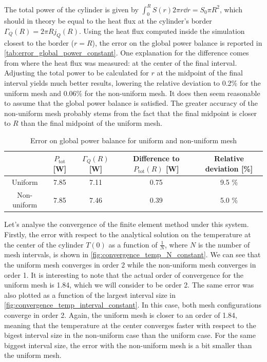 The total power of the cylinder is given by \(\int_{0}^{R} S(r) 2\pi r \dd r = S_0 \pi R^2\), which should in theory be equal to the heat flux at the cylinder's border \(\Gamma_Q(R) = 2 \pi R j_Q(R)\). Using the heat flux computed inside the simulation closest to the border (\(r=R\)), the error on the global power balance is reported in \autoref{tab:error_global_power_constant}. One explanation for the difference comes from where the heat flux was measured: at the center of the final interval. Adjusting the total power to be calculated for \(r\) at the midpoint of the final interval yields much better results, lowering the relative deviation to 0.2\% for the uniform mesh and 0.06\% for the non-uniform mesh. It does then seem reasonable to assume that the global power balance is satisfied. The greater accuracy of the non-uniform mesh probably stems from the fact that the final midpoint is closer to \(R\) than the final midpoint of the uniform mesh.

\begin{table}[h]
    \centering
    \begin{tabulary}{\linewidth}{C|C C C C}
        \toprule
        & \(P_\textrm{tot}\) [\si{\watt}] & \(\Gamma_Q(R)\) [\si{\watt}] & Difference to \(P_\textrm{tot}(R)\) [\si{\watt}] & Relative deviation [\%] \\
        \midrule
        Uniform & 7.85 & 7.11 & 0.75 & 9.5 \% \\
        Non-uniform & 7.85 & 7.46 & 0.39 & 5.0 \% \\
        \bottomrule
    \end{tabulary}
    \caption{Error on global power balance for uniform and non-uniform mesh}
    \label{tab:error_global_power_constant}
\end{table}

Let's analyse the convergence of the finite element method under this system. Firstly, the error with respect to the analytical solution on the temperature at the center of the cylinder \(T(0)\) as a function of \(\frac{1}{N}\), where \(N\) is the number of mesh intervals, is shown in \autoref{fig:convergence_temp_N_constant}. We can see that the uniform mesh converges in order 2 while the non-uniform mesh converges in order 1. It is interesting to note that the actual order of convergence for the uniform mesh is 1.84, which we will consider to be order 2. The same error was also plotted as a function of the largest interval size in \autoref{fig:convergence_temp_interval_constant}. In this case, both mesh configurations converge in order 2. Again, the uniform mesh is closer to an order of 1.84, meaning that the temperature at the center converges faster with respect to the bigest interval size in the non-uniform case than the uniform case. For the same biggest interval size, the error with the non-uniform mesh is a bit smaller than the uniform mesh.

